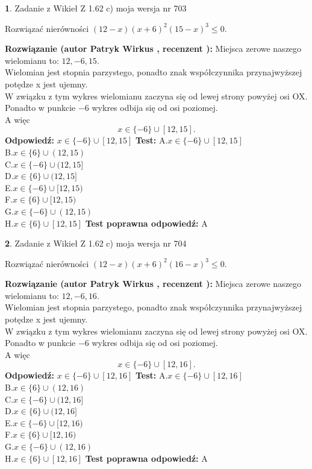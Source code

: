 \documentclass[12pt, a4paper]{article}
\theoremstyle{definition} %
\newtheorem{zad}{}
\newcommand{\zadStart}[1]{\begin{zad}#1\newline}
\newcommand{\zadStop}{\end{zad}}
\newcommand{\rozwStart}[2]{\noindent \textbf{Rozwiązanie (autor #1 , recenzent #2): }\newline}
\newcommand{\rozwStop}{\newline}
\newcommand{\odpStart}{\noindent \textbf{Odpowiedź:}\newline}
\newcommand{\odpStop}{\newline}
\newcommand{\testStart}{\noindent \textbf{Test:}\newline}
\newcommand{\testStop}{\newline}
\newcommand{\kluczStart}{\noindent \textbf{Test poprawna odpowiedź:}\newline}
\newcommand{\kluczStop}{\newline}
\begin{document}
\zadStart{Zadanie z Wikieł Z 1.62 c) moja wersja nr 703}

Rozwiązać nierówności $(12-x)(x+6)^{2}(15-x)^{3}\le0$.
\zadStop
\rozwStart{Patryk Wirkus}{}
Miejsca zerowe naszego wielomianu to: $12, -6, 15$.\\
Wielomian jest stopnia parzystego, ponadto znak współczynnika przy\linebreak najwyższej potędze x jest ujemny.\\ W związku z tym wykres wielomianu zaczyna się od lewej strony powyżej osi OX.\\
Ponadto w punkcie $-6$ wykres odbija się od osi poziomej.\\
A więc $$x \in \{-6\} \cup [12,15].$$
\rozwStop
\odpStart
$x \in \{-6\} \cup [12,15]$
\odpStop
\testStart
A.$x \in \{-6\} \cup [12,15]$\\
B.$x \in \{6\} \cup (12,15)$\\
C.$x \in \{-6\} \cup (12,15]$\\
D.$x \in \{6\} \cup (12,15]$\\
E.$x \in \{-6\} \cup [12,15)$\\
F.$x \in \{6\} \cup [12,15)$\\
G.$x \in \{-6\} \cup (12,15)$\\
H.$x \in \{6\} \cup [12,15]$
\testStop
\kluczStart
A
\kluczStop



\zadStart{Zadanie z Wikieł Z 1.62 c) moja wersja nr 704}

Rozwiązać nierówności $(12-x)(x+6)^{2}(16-x)^{3}\le0$.
\zadStop
\rozwStart{Patryk Wirkus}{}
Miejsca zerowe naszego wielomianu to: $12, -6, 16$.\\
Wielomian jest stopnia parzystego, ponadto znak współczynnika przy\linebreak najwyższej potędze x jest ujemny.\\ W związku z tym wykres wielomianu zaczyna się od lewej strony powyżej osi OX.\\
Ponadto w punkcie $-6$ wykres odbija się od osi poziomej.\\
A więc $$x \in \{-6\} \cup [12,16].$$
\rozwStop
\odpStart
$x \in \{-6\} \cup [12,16]$
\odpStop
\testStart
A.$x \in \{-6\} \cup [12,16]$\\
B.$x \in \{6\} \cup (12,16)$\\
C.$x \in \{-6\} \cup (12,16]$\\
D.$x \in \{6\} \cup (12,16]$\\
E.$x \in \{-6\} \cup [12,16)$\\
F.$x \in \{6\} \cup [12,16)$\\
G.$x \in \{-6\} \cup (12,16)$\\
H.$x \in \{6\} \cup [12,16]$
\testStop
\kluczStart
A
\kluczStop
\end{document}
